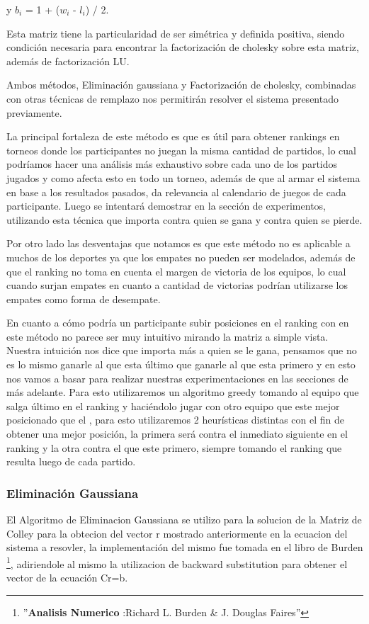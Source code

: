 y $b_i$ = 1 +  ($w_i$ - $l_i$) / 2.

Esta matriz tiene la particularidad de ser simétrica y definida positiva, siendo condición necesaria para encontrar la factorización de cholesky sobre esta matriz, además de factorización LU.

Ambos métodos, Eliminación gaussiana y Factorización de cholesky, combinadas con otras técnicas de remplazo nos permitirán resolver el sistema presentado previamente.

La principal fortaleza de este método es que es útil para obtener rankings en torneos donde los participantes no juegan la misma cantidad de partidos, lo cual 
podríamos hacer una análisis más exhaustivo sobre cada uno de los partidos jugados y como afecta esto en todo un torneo,
además de que al armar el sistema en base a los resultados pasados, da relevancia al calendario de juegos de cada participante. 
Luego se intentará demostrar en la sección de experimentos, utilizando esta técnica que importa contra quien se gana y contra quien se pierde.

Por otro lado las desventajas que notamos es que este método no es aplicable a muchos de los deportes ya que los empates no pueden ser modelados, además de que el ranking no toma en cuenta
el margen de victoria de los equipos, lo cual cuando surjan empates en cuanto a cantidad de victorias podrían utilizarse los empates como forma de desempate.

En cuanto a cómo podría un participante subir posiciones en el ranking con en este método no parece ser muy intuitivo mirando la matriz a simple vista. Nuestra intuición nos dice que importa más a quien se le gana, pensamos que no es lo mismo ganarle al que esta último que ganarle al que esta primero
y en esto nos vamos a basar para realizar nuestras experimentaciones en las secciones de más adelante.
Para esto utilizaremos un algoritmo greedy tomando al equipo que salga último en el ranking y haciéndolo jugar con otro equipo que este mejor posicionado que el , para esto utilizaremos 2 heurísticas distintas
con el fin de obtener una mejor posición, la primera será contra el inmediato siguiente en el ranking y la otra contra el que este primero, siempre tomando el ranking que resulta luego de cada partido.

\subsubsection{Eliminación Gaussiana}

El Algoritmo de Eliminacion Gaussiana se utilizo para la solucion de la Matriz de Colley para la obtecion del vector r mostrado anteriormente en la ecuacion del sistema a resovler, la implementación del mismo fue tomada en el libro de Burden \footnote{''\textbf{Analisis Numerico }:Richard L. Burden & J. Douglas Faires''}, adiriendole al mismo  la utilizacion de backward substitution para obtener el vector de la ecuaci\'on Cr=b.

